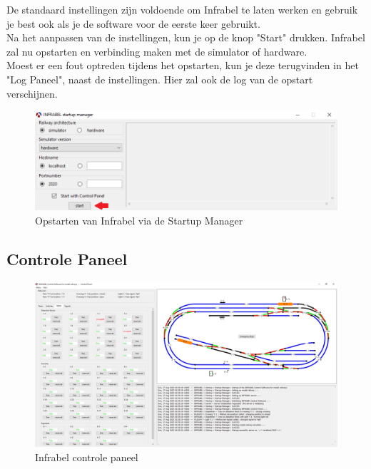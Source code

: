 \documentclass[a4paper, 11pt]{article}
\newcommand{\<}{\scriptsize\textless\normalsize}
\renewcommand{\>}{\scriptsize\textgreater\normalsize}
\begin{document}
De standaard instellingen zijn voldoende om Infrabel te laten werken en gebruik je best ook als je de software voor de eerste keer gebruikt.\\
Na het aanpassen van de instellingen, kun je op de knop "Start" drukken. Infrabel zal nu opstarten en verbinding maken met de simulator of hardware.\\
Moest er een fout optreden tijdens het opstarten, kun je deze terugvinden in het "Log Paneel", naast de instellingen. Hier zal ook de log van de opstart verschijnen.\\
\begin{figure}[h]
	\begin{center}
		\includegraphics[scale=.5]{Bestanden/infrabel-startup-rkt.png}
		\caption{Opstarten van Infrabel via de Startup Manager}
	\end{center}
\end{figure}

\newpage

\subsection{Controle Paneel} %
\begin{figure}[h]
	\begin{center}
		\includegraphics[scale=.35]{Bestanden/infrabel-gui-rkt.png}
		\caption{Infrabel controle paneel}
	\end{center}
\end{figure}
\end{document}
